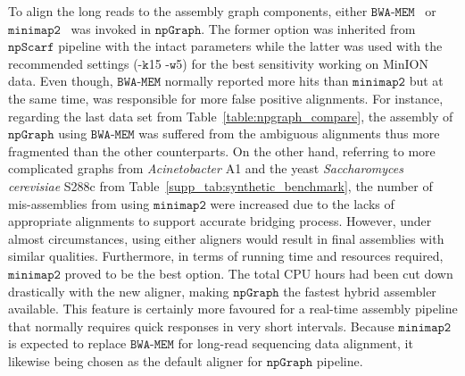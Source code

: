 \documentclass[10pt,twocolumn,twoside]{genpaper}
\newcommand{\npscarf}{$\mathtt{npScarf}$}
\newcommand{\npgraph}{$\mathtt{npGraph}$}
\newcommand{\minimap}{$\mathtt{minimap2}$}
\newcommand{\bwa}{$\mathtt{BWA\text{-}MEM}$}
\begin{document}
To align the long reads to the assembly graph components, either \bwa{}~\cite{Li2013} or \minimap{}~\cite{Li2016} was invoked in \npgraph{}. 
The former option was inherited from \npscarf{} pipeline with the intact parameters
while the latter was used with the recommended settings (-$\mathtt{k}$15 -$\mathtt{w}$5) for the best sensitivity working on MinION data.
Even though, \bwa{} normally reported more hits than \minimap{} but at the same time, was responsible for more false positive alignments.
For instance, regarding the last data set from Table~\ref{table:npgraph_compare}, the assembly of \npgraph{} using \bwa{} was suffered from the ambiguous alignments thus more fragmented than the other counterparts. 
On the other hand, referring to more complicated graphs from \emph{Acinetobacter} A1 and the yeast \emph{Saccharomyces cerevisiae} S288c from Table~\ref{supp_tab:synthetic_benchmark}, the number of mis-assemblies from using \minimap{} were increased due to the lacks of appropriate alignments to support accurate bridging process.
However, under almost circumstances, using either aligners would result in final assemblies with similar qualities.
Furthermore, in terms of running time and resources required, \minimap{} proved to be the best option. 
The total CPU hours had been cut down drastically with the new aligner, making \npgraph{} the fastest hybrid assembler available.
This feature is certainly more favoured for a real-time assembly pipeline that normally requires quick responses in very short intervals.
Because \minimap{} is expected to replace \bwa{} for long-read sequencing data alignment, it likewise being chosen as the default aligner for \npgraph{} pipeline.
\end{document}
